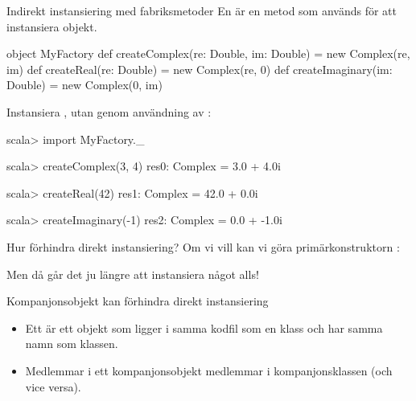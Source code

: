 \begin{Slide}{Indirekt instansiering med fabriksmetoder}\SlideFontSmall
En  är en metod som används för att instansiera objekt.
\begin{Code}[basicstyle=\SlideFontSize{8}{12}\ttfamily\selectfont]
object MyFactory {
  def createComplex(re: Double, im: Double) = new Complex(re, im)
  def createReal(re: Double)                = new Complex(re, 0)
  def createImaginary(im: Double)           = new Complex(0, im)
}
\end{Code}
\pause
Instansiera , utan  genom användning av :
\begin{REPL}
scala> import MyFactory._

scala> createComplex(3, 4)
res0: Complex = 3.0 + 4.0i

scala> createReal(42)
res1: Complex = 42.0 + 0.0i

scala> createImaginary(-1)
res2: Complex = 0.0 + -1.0i
\end{REPL}
\end{Slide}

\begin{Slide}{Hur förhindra direkt instansiering?}
Om vi vill  kan vi göra primärkonstruktorn :
Men då går det ju  längre att instansiera något alls!  \code{   :(}
\end{Slide}

\begin{Slide}{Kompanjonsobjekt kan förhindra direkt instansiering}
\begin{itemize}
\item Ett  är ett objekt som ligger i samma kodfil som en klass och har samma namn som klassen. 

\item Medlemmar i ett kompanjonsobjekt  medlemmar i kompanjonsklassen (och vice versa). 


\end{itemize}
\end{Slide}

